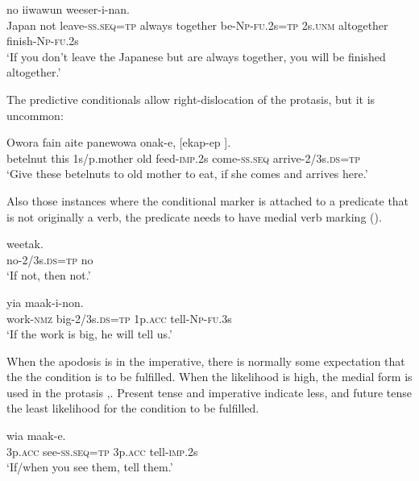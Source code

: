 \ea%
\label{ex:8:x1653}
\gll [Yaapan  me  \textstyleEmphasizedVernacularWords{piipu-ap=na}  anane  epaskun  ika-i-nan=na] no  iiwawun  weeser-i-nan.
\\
Japan  not  leave-\textsc{ss}.\textsc{seq}=\textsc{tp} always together  be-\textsc{Np}-\textsc{fu}.2s=\textsc{tp} 2s.\textsc{unm} altogether  finish-\textsc{Np}-\textsc{fu}.2s\\
\glt`If you don't leave the Japanese but are always together, you will be finished altogether.'
\z


The predictive conditionals allow right-dislocation of the protasis, but it is uncommon: 

\ea%
\label{ex:8:x1662}
\gll Owora  fain  aite  panewowa  onak-e,  [ekap-ep ]. \\
betelnut  this  1s/p.mother  old  feed-\textsc{imp}.2s come-\textsc{ss}.\textsc{seq} arrive-2/3s.\textsc{ds}=\textsc{tp}\\
\glt`Give these betelnuts to old mother to eat, if she comes and arrives here.'
\z


Also those instances where the conditional marker is attached to a predicate that is not originally a verb, the predicate needs to have medial verb marking ().

\ea%
\label{ex:8:x1660}
\gll [\textstyleEmphasizedVernacularWords{Weetak-eya}\textstyleEmphasizedVernacularWords{=na}]  weetak.\\
no-2/3s.\textsc{ds}=\textsc{tp} no\\
\glt`If not, then not.'
\z


\ea%
\label{ex:8:x1661}
\gll [Mauw-owa  \textstyleEmphasizedVernacularWords{manek-aya=na}]  yia  maak-i-non.\\
work-\textsc{nmz} big-2/3s.\textsc{ds}=\textsc{tp} 1p.\textsc{acc} tell-\textsc{Np}-\textsc{fu}.3s\\
\glt`If the work is big, he will tell us.'
\z


When the apodosis is in the imperative, there is normally some expectation that the the condition is to be fulfilled. When the likelihood is high, the medial form is used in the protasis ,. Present tense  and imperative  indicate less, and future tense  the least likelihood for the condition to be fulfilled.

\ea%
\label{ex:8:x1650}
\gll [Wia  \textstyleEmphasizedVernacularWords{uruf-ap=na}]  wia  maak-e.\\
3p.\textsc{acc} see-\textsc{ss}.\textsc{seq}=\textsc{tp} 3p.\textsc{acc} tell-\textsc{imp}.2s\\
\glt`If/when you see them, tell them.'
\z



